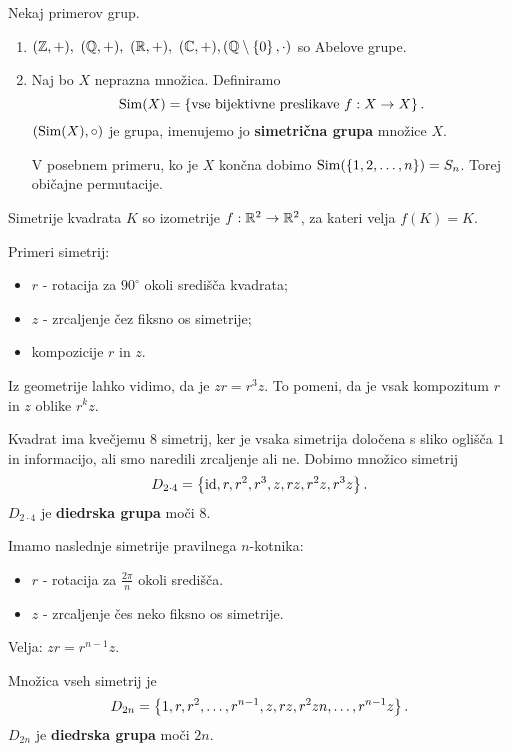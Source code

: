 \begin{zgled}
    Nekaj primerov grup.
    \begin{enumerate}
        \item $(\mathbb{Z}, +), \ (\mathbb{Q}, +), \ (\mathbb{R}, +), \ (\mathbb{C}, +), (\mathbb{Q} \setminus \left\{0\right\}, \cdot)$ so Abelove grupe.
        \item Naj bo $X$ neprazna množica. Definiramo 
        $$\operatorname{Sim}(X) = \left\{\text{vse bijektivne preslikave } f: X \to X\right\}.$$ $(\operatorname{Sim}(X), \circ)$ 
        je grupa, imenujemo jo \textbf{simetrična grupa} množice $X$.        
        
        V posebnem primeru, ko je $X$ končna dobimo $\operatorname{Sim}(\left\{1, 2, \ldots, n\right\}) = S_n$. Torej običajne permutacije.
    \end{enumerate}
\end{zgled}

\begin{zgled}
    Simetrije kvadrata $K$ so izometrije $f: \mathbb{R}^2 \to \mathbb{R}^2$, za kateri velja $f(K) = K$. 
    
    Primeri simetrij: 
    \begin{itemize}
        \item $r$ - rotacija za $90^{\circ}$ okoli središča kvadrata;
        \item $z$ - zrcaljenje čez fiksno os simetrije;
        \item kompozicije $r$ in $z$.
    \end{itemize}
    
    Iz geometrije lahko vidimo, da je $zr = r^3z$. To pomeni, da je vsak kompozitum $r$ in $z$ oblike $r^kz$.
    
    Kvadrat ima kvečjemu $8$ simetrij, ker je vsaka simetrija določena s sliko oglišča $1$ in informacijo, ali smo naredili zrcaljenje ali ne. Dobimo množico simetrij $$D_{2 \cdot 4} = \left\{\operatorname{id}, r, r^2, r^3, z, rz, r^2z, r^3z\right\}.$$ $D_{2\cdot 4}$ je \textbf{diedrska grupa} moči $8$.
\end{zgled}

\begin{zgled}
    Imamo naslednje simetrije pravilnega $n$-kotnika:
    \begin{itemize}
        \item $r$ - rotacija za $\frac{2 \pi}{n}$ okoli središča.
        \item $z$ - zrcaljenje čes neko fiksno os simetrije.
    \end{itemize}
    Velja: $zr = r^{n-1}z$. 
    
    Množica vseh simetrij je $$D_{2n} = \left\{1, r, r^2, \ldots, r^{n-1}, z, rz, r^2zn, \ldots, r^{n-1}z\right\}.$$
    $D_{2n}$ je \textbf{diedrska grupa} moči $2n$.
\end{zgled}

